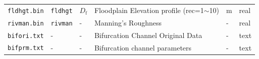 \begin{table}[htbp]
\begin{tabular}[h]{p{3.5cm}p{1.5cm}p{1.5cm}p{5cm}p{1cm}p{1cm}}
    \texttt{fldhgt.bin}        & \texttt{fldhgt} & $D_{\mathrm {f}} $ & Floodplain Elevation profile (rec=1$\sim$10) & m         & real    \\
    \texttt{rivman.bin}        & \texttt{rivman} & -                  & Manning’s Roughness                          & -         & real    \\
    \texttt{bifori.txt}        & -               & -                  & Bifurcation Channel Original Data            & -         & text    \\
    \texttt{bifprm.txt}        & -               & -                  & Bifurcation channel parameters               & -         & text    \\ \bottomrule
  \end{tabular}
\end{table}


